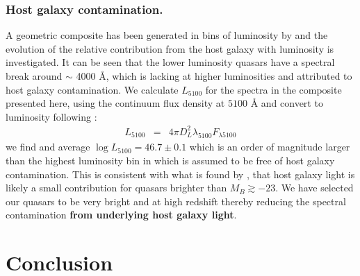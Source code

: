 \documentclass{aa}    %
\newcommand{\eqlabel}[1]{\label{eq:#1}}
\newcommand{\sectlabel}[1]{\label{sect:#1}}
\begin{document}
 
 \subsubsection{Host galaxy contamination.}  \sectlabel{Host galaxy
contamination}
A geometric composite has been generated in bins of luminosity by
\citet{Shen2011} and the evolution of the relative contribution from the host
galaxy with luminosity is investigated. It can be seen that the lower luminosity
quasars have a spectral break around $\sim$ 4000 \AA, which is lacking at higher
luminosities and attributed to host galaxy contamination. We calculate
$L_{5100}$ for the spectra in the composite presented here, using the continuum
flux density at $5100$ {\AA} and convert to luminosity following
\cite{Netzer2007}:
\begin{eqnarray}\eqlabel{l5100}
L_{5100} &=&    4 \pi D_{L} ^{2} \lambda_{5100}  F_{\lambda5100}
\end{eqnarray}
we find and average \textbf{$\log L_{5100} = 46.7 \pm 0.1$} which is an order of
magnitude larger than the highest luminosity bin in \cite{Shen2011} which is
assumed to be free of host galaxy contamination. This is consistent with what is
found by \citet{Hopkins2007}, that host galaxy light is likely a small
contribution for quasars brighter than $M_{B} \gtrsim -23$. We have selected our
quasars to be very bright and at high redshift thereby reducing the spectral
contamination \textbf{from underlying host galaxy light}. 





\section{Conclusion}  \sectlabel{conclusion}
\end{document}
